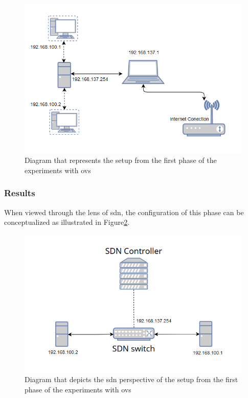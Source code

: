 \begin{figure}
	\centering
	\includegraphics[width=\textwidth]{Chapters/Figures/tests/ovs_phase_1/setup_diagram.PNG}
	\caption{Diagram that represents the setup from the first phase of the experiments with \gls{ovs}}
	\label{fig:exp1_phase1_diagram}
\end{figure}

\subsubsection{Results}

When viewed through the lens of \gls{sdn}, the configuration of this phase can be conceptualized as illustrated in Figure\ref{fig:exp1_phase1_sdn_diagram}.

\begin{figure}
	\centering
	\includegraphics[width=\textwidth]{Chapters/Figures/tests/ovs_phase_1/sdn_diagram.PNG}
	\caption{Diagram that depicts the \gls{sdn} perspective of the setup from the first phase of the experiments with \gls{ovs}}
	\label{fig:exp1_phase1_sdn_diagram}
\end{figure}

